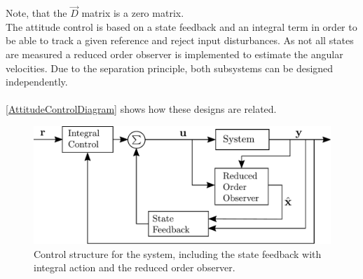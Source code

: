 \noindent Note, that the $\vec{D}$ matrix is a zero matrix.\\
\indent The attitude control is based on a state feedback and an integral term in order to be able to track a given reference and reject input disturbances. As not all states are measured a reduced order observer is implemented to estimate the angular velocities. Due to the separation principle, both subsystems can be designed independently. \cite{ssReference}
\\
\\
\noindent\autoref{AttitudeControlDiagram} shows how these designs are related.
\begin{figure}[H]
    \centering
    \includegraphics[width=.4\textwidth]{figures/AttitudeControlDiagram}
    \caption{ Control structure for the system, including the state feedback with integral action and the reduced order observer.}
    \label{AttitudeControlDiagram}
\end{figure}

